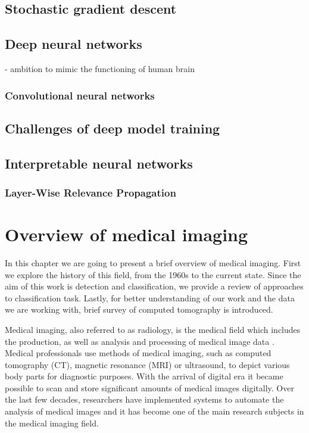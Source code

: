 \section{Stochastic gradient descent}


\section{Deep neural networks}
- ambition to mimic the functioning of human brain
\subsection{Convolutional neural networks}
\section{Challenges of deep model training}
\section{Interpretable neural networks}
\subsection{Layer-Wise Relevance Propagation}


\chapter{Overview of medical imaging}
In this chapter we are going to present a brief overview of medical imaging. First we explore the history of this field, from the 1960s to the current state. Since the aim of this work is detection and classification, we provide a review of approaches to classification task. Lastly, for better understanding of our work and the data we are working with, brief survey of computed tomography is introduced.

Medical imaging, also referred to as radiology, is the medical field which includes the production, as well as analysis and processing of medical image data \cite{diagnostic50years}. Medical professionals use methods of medical imaging, such as computed tomography (CT), magnetic resonance (MRI) or ultrasound, to depict various body parts for diagnostic purposes. With the arrival of digital era it became possible to scan and store significant amounts of medical images digitally. Over the last few decades, researchers have implemented systems to automate the analysis of medical images and it has become one of the main research subjects in the medical imaging field. 

